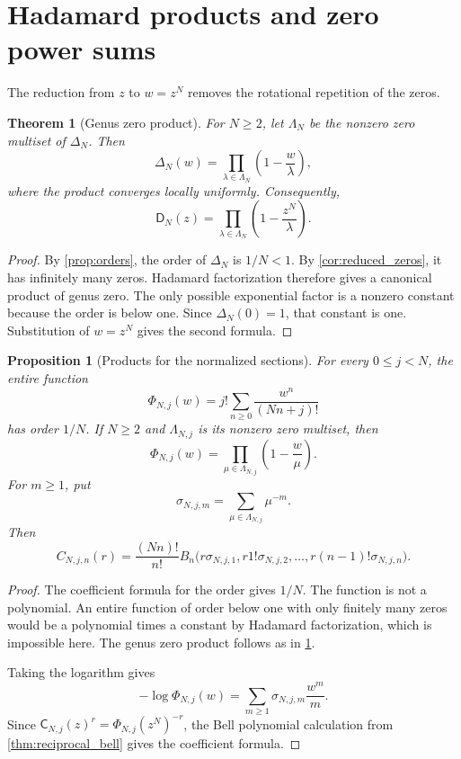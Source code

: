 \documentclass{aomart}
\newtheorem{theorem}{Theorem}[section]
\newtheorem{proposition}[proposition]{Proposition}
\theoremstyle{definition}
\theoremstyle{remark}
\newcommand{\Dfun}{\mathsf D}
\newcommand{\Cfun}{\mathsf C}
\begin{document}
\section{Hadamard products and zero power sums}\label{sec:hadamard}

The reduction from $z$ to $w=z^N$ removes the rotational repetition of the zeros.

\begin{theorem}[Genus zero product]\label{thm:genus_zero_product}
For $N\geq2$, let $\Lambda_N$ be the nonzero zero multiset of $\Delta_N$.  Then
\[
\Delta_N(w)
=
\prod_{\lambda\in\Lambda_N}
\left(1-\frac w\lambda\right),
\]
where the product converges locally uniformly.  Consequently,
\[
\Dfun_N(z)
=
\prod_{\lambda\in\Lambda_N}
\left(1-\frac{z^N}{\lambda}\right).
\]
\end{theorem}

\begin{proof}
By \cref{prop:orders}, the order of $\Delta_N$ is $1/N<1$.  By \cref{cor:reduced_zeros}, it has infinitely many zeros.  Hadamard factorization therefore gives a canonical product of genus zero.  The only possible exponential factor is a nonzero constant because the order is below one.  Since $\Delta_N(0)=1$, that constant is one.  Substitution of $w=z^N$ gives the second formula.
\end{proof}


\begin{proposition}[Products for the normalized sections]\label{prop:normalized_section_product}
For every $0\leq j<N$, the entire function
\[
\Phi_{N,j}(w)
=
j!\sum_{n\geq0}\frac{w^n}{(Nn+j)!}
\]
has order $1/N$.  If $N\geq2$ and $\Lambda_{N,j}$ is its nonzero zero multiset, then
\[
\Phi_{N,j}(w)
=
\prod_{\mu\in\Lambda_{N,j}}
\left(1-\frac w\mu\right).
\]
For $m\geq1$, put
\[
\sigma_{N,j,m}
=
\sum_{\mu\in\Lambda_{N,j}}\mu^{-m}.
\]
Then
\[
C_{N,j,n}(r)
=
\frac{(Nn)!}{n!}
B_n\bigl(
 r\sigma_{N,j,1},
 r1!\sigma_{N,j,2},
 \ldots,
 r(n-1)!\sigma_{N,j,n}
\bigr).
\]
\end{proposition}

\begin{proof}
The coefficient formula for the order gives $1/N$.  The function is not a polynomial.  An entire function of order below one with only finitely many zeros would be a polynomial times a constant by Hadamard factorization, which is impossible here.  The genus zero product follows as in \cref{thm:genus_zero_product}.

Taking the logarithm gives
\[
-\log\Phi_{N,j}(w)
=
\sum_{m\geq1}\sigma_{N,j,m}\frac{w^m}{m}.
\]
Since $\Cfun_{N,j}(z)^r=\Phi_{N,j}(z^N)^{-r}$, the Bell polynomial calculation from \cref{thm:reciprocal_bell} gives the coefficient formula.
\end{proof}
\end{document}
